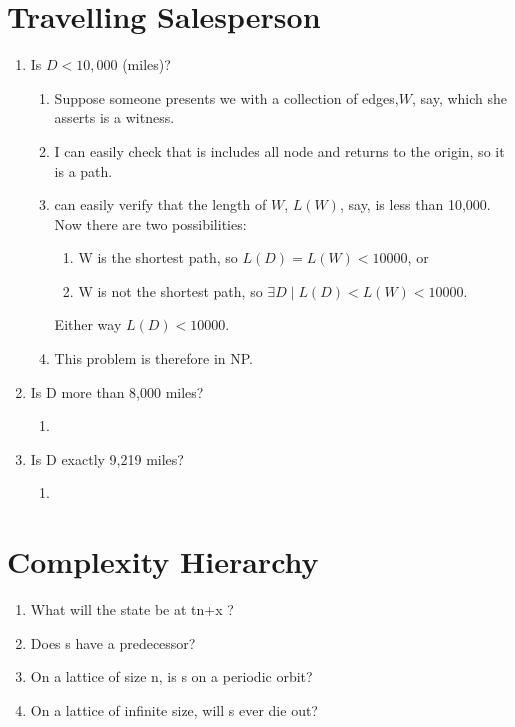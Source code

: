\documentclass[]{article}
\begin{document}
\section{Travelling Salesperson}

\begin{enumerate}
	\item Is $D<10,000$ (miles)?
	\begin{enumerate}
		\item Suppose someone presents we with a collection of edges,$W$, say, which she asserts is a witness.
		\item I can easily check that is includes all node and returns to the origin, so it is a path.
		\item can easily verify that the length of $W$, $L(W)$, say, is less than 10,000. Now there are two possibilities:
		\begin{enumerate}
			\item W is the shortest path, so  $L(D)=L(W)<10000$, or
			\item W is not the shortest path, so $\exists D \mid L(D)<L(W)<10000$.
		\end{enumerate}
		Either way $L(D)<10000$.
		\item This problem is therefore in NP.
	\end{enumerate}
	
	\item Is D more than 8,000 miles?
		\begin{enumerate}
		\item 
	\end{enumerate}
	
	\item Is D exactly 9,219 miles? 
		\begin{enumerate}
		\item 
	\end{enumerate}
\end{enumerate}

\section{Complexity Hierarchy}

\begin{enumerate}
	\item What will the state be at tn+x ?
	\item Does s have a predecessor?
	\item On a lattice of size n, is s on a periodic orbit?
	\item On a lattice of infinite size, will s ever die out?
	
\end{enumerate}
\end{document}
